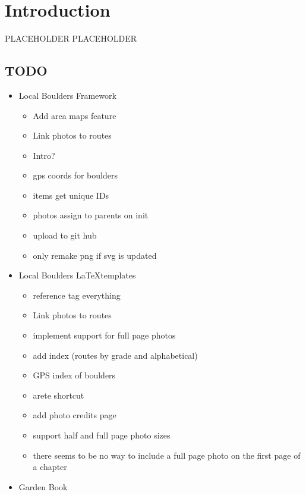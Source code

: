 \chapter{Introduction}
\lhead{\textcolor{\chapterColor}{\rule[-2pt]{\textwidth}{15pt}}}
PLACEHOLDER
\lipsum[1]
PLACEHOLDER
\section{TODO}
\begin{itemize}
	\item Local Boulders Framework
	\begin{itemize}
		\item Add area maps feature
		\item Link photos to routes
		\item Intro?
		\item gps coords for boulders
		\item items get unique IDs
		\item photos assign to parents on init
		\item upload to git hub
		\item only remake png if svg is updated
	\end{itemize}
	\item Local Boulders \LaTeX templates
	\begin{itemize}
		\item reference tag everything
		\item Link photos to routes
		\item implement support for full page photos
		\item add index (routes by grade and alphabetical)
		\item GPS index of boulders
		\item arete shortcut
		\item add photo credits page
		\item support half and full page photo sizes
		\item there seems to be no way to include a full page photo on the first page of a chapter
	\end{itemize}
	\item Garden Book
\end{itemize}
\clearpage